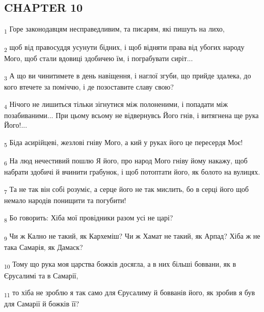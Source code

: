 \subsection{CHAPTER 10}
\begin{tcolorbox}
\textsubscript{1} Горе законодавцям несправедливим, та писарям, які пишуть на лихо,
\end{tcolorbox}
\begin{tcolorbox}
\textsubscript{2} щоб від правосуддя усунути бідних, і щоб відняти права від убогих народу Мого, щоб стали вдовиці здобичею їм, і пограбувати сиріт...
\end{tcolorbox}
\begin{tcolorbox}
\textsubscript{3} А що ви чинитимете в день навіщення, і наглої згуби, що прийде здалека, до кого втечете за поміччю, і де позоставите славу свою?
\end{tcolorbox}
\begin{tcolorbox}
\textsubscript{4} Нічого не лишиться тільки зігнутися між полоненими, і попадати між позабиваними... При цьому всьому не відвернувсь Його гнів, і витягнена ще рука Його!...
\end{tcolorbox}
\begin{tcolorbox}
\textsubscript{5} Біда асирійцеві, жезлові гніву Мого, а кий у руках його це пересердя Моє!
\end{tcolorbox}
\begin{tcolorbox}
\textsubscript{6} На люд нечестивий пошлю Я його, про народ Мого гніву йому накажу, щоб набрати здобичі й вчинити грабунок, і щоб потоптати його, як болото на вулицях.
\end{tcolorbox}
\begin{tcolorbox}
\textsubscript{7} Та не так він собі розуміє, а серце його не так мислить, бо в серці його щоб немало народів понищити та погубити!
\end{tcolorbox}
\begin{tcolorbox}
\textsubscript{8} Бо говорить: Хіба мої провідники разом усі не царі?
\end{tcolorbox}
\begin{tcolorbox}
\textsubscript{9} Чи ж Кално не такий, як Кархеміш? Чи ж Хамат не такий, як Арпад? Хіба ж не така Самарія, як Дамаск?
\end{tcolorbox}
\begin{tcolorbox}
\textsubscript{10} Тому що рука моя царства божків досягла, а в них більші боввани, як в Єрусалимі та в Самарії,
\end{tcolorbox}
\begin{tcolorbox}
\textsubscript{11} то хіба не зроблю я так само для Єрусалиму й бовванів його, як зробив я був для Самарії й божків її?
\end{tcolorbox}
